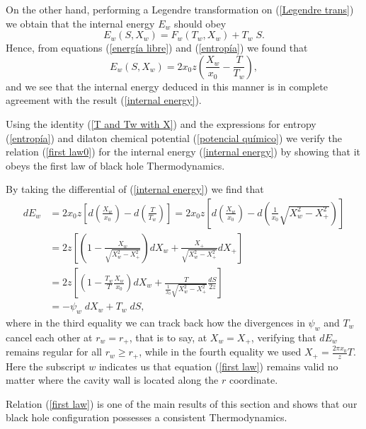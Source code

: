 \documentclass[sn-mathphys,Numbered]{sn-jnl}%
\theoremstyle{thmstyleone}%
\theoremstyle{thmstyletwo}%
\theoremstyle{thmstylethree}%
\begin{document}
On the other hand, performing a Legendre transformation on (\ref{Legendre trans}) we obtain that the internal energy $E_w$ should obey 
%
\begin{equation} \label{legendre trans 2}
    E_w(S, X_w)=F_w(T_w, X_w)+ T_w \;S. 
\end{equation}
%
Hence, from equations (\ref{energía libre}) and (\ref{entropía}) we found that
%
\begin{equation} \label{internal energy 2}
    E_w(S,X_w)=2x_0z\left(\frac{X_w}{x_0}-\frac{T}{T_w}\right),
\end{equation}
and we see that the internal energy deduced in this manner is in complete agreement with the result (\ref{internal energy}).

Using the identity (\ref{T and Tw with X}) and the expressions for entropy (\ref{entropía})  and dilaton chemical potential (\ref{potencial químico}) we verify the relation (\ref{first law0}) for the internal energy (\ref{internal energy}) by showing that it obeys the first law of black hole Thermodynamics. 

By taking  the differential of (\ref{internal energy}) we find that  
\begin{equation} \label{first law}
\begin{split}
    dE_w &= 2x_0 z \left[ d\left(\frac{X_w}{x_0}\right)-d\left(\frac{T}{T_w}\right)\right]= 2x_0z \left[ d\left(\frac{X_w}{x_0}\right)-d\left(\frac{1}{x_0}\sqrt{X_{w}^2-X_{+}^2}\right)\right]\\
    &= 2z \left[ \left(1-\frac{X_w}{\sqrt{X_{w}^2-X_{+}^2}}\right)dX_w+\frac{X_+}{\sqrt{X_{w}^2-X_{+}^2}} dX_+\right]\\
    &= 2z \left[ \left(1-\frac{T_w}{T} \frac{X_w}{x_0}\right)dX_w+\frac{T}{\frac{1}{x_0}\sqrt{X_{w}^2-X_{+}^2}} \frac{dS}{2z}\right]\\
    &= -\psi_w\;dX_w+T_w\;dS,
\end{split}    
\end{equation}
where in the third equality we can track back how the divergences in $\psi_w$ and $T_w$ cancel each other at $r_w=r_+$, that is to say, at $X_w=X_+$, verifying that $dE_w$ remains regular for all $r_w \geq r_+$, while in the
fourth equality we used $X_+=\frac{2\pi x_0}{z} T$. Here the subscript $w$ indicates us that equation (\ref{first law}) remains valid no matter where the cavity wall is located along the $r$ coordinate. 

Relation (\ref{first law}) is one of the main results of this section and shows that our black hole configuration possesses a consistent Thermodynamics.
\end{document}

